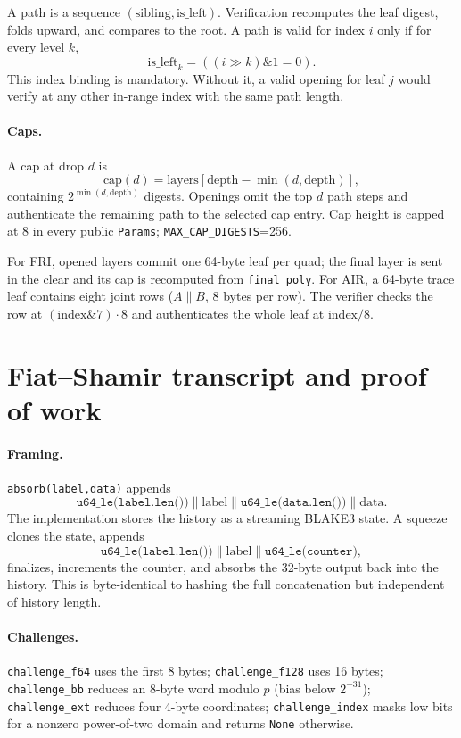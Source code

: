 \documentclass[11pt,a4paper]{article}
\begin{document}
A path is a sequence $(\mathrm{sibling},\mathrm{is\_left})$. Verification
recomputes the leaf digest, folds upward, and compares to the root. A path is
valid for index $i$ only if for every level $k$,
\[
\mathrm{is\_left}_k=((i\gg k)\&1=0).
\]
This index binding is mandatory. Without it, a valid opening for leaf $j$
would verify at any other in-range index with the same path length.

\paragraph{Caps.} A cap at drop $d$ is
\[
\mathrm{cap}(d)=\mathrm{layers}[\mathrm{depth}-\min(d,\mathrm{depth})],
\]
containing $2^{\min(d,\mathrm{depth})}$ digests. Openings omit the top $d$
path steps and authenticate the remaining path to the selected cap entry.
Cap height is capped at 8 in every public \texttt{Params};
\texttt{MAX\_CAP\_DIGESTS}=256.

For FRI, opened layers commit one 64-byte leaf per quad; the final layer is
sent in the clear and its cap is recomputed from \texttt{final\_poly}. For
AIR, a 64-byte trace leaf contains eight joint rows ($A\|B$, 8 bytes per
row). The verifier checks the row at $(\mathrm{index}\&7)\cdot8$ and
authenticates the whole leaf at $\mathrm{index}/8$.

\section{Fiat--Shamir transcript and proof of work}

\paragraph{Framing.} \texttt{absorb(label,data)} appends
\[
\texttt{u64\_le(label.len())}\|\text{label}\|
\texttt{u64\_le(data.len())}\|\text{data}.
\]
The implementation stores the history as a streaming BLAKE3 state. A squeeze
clones the state, appends
\[
\texttt{u64\_le(label.len())}\|\text{label}\|\texttt{u64\_le(counter)},
\]
finalizes, increments the counter, and absorbs the 32-byte output back into
the history. This is byte-identical to hashing the full concatenation but
independent of history length.

\paragraph{Challenges.} \texttt{challenge\_f64} uses the first 8 bytes;
\texttt{challenge\_f128} uses 16 bytes; \texttt{challenge\_bb} reduces an
8-byte word modulo $p$ (bias below $2^{-31}$); \texttt{challenge\_ext} reduces
four 4-byte coordinates; \texttt{challenge\_index} masks low bits for a
nonzero power-of-two domain and returns \texttt{None} otherwise.
\end{document}
